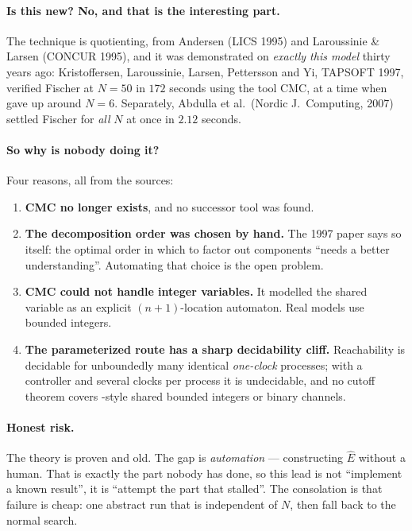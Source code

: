 \paragraph{Is this new? No, and that is the interesting part.} The technique is quotienting, from
Andersen (LICS 1995) and Laroussinie \& Larsen (CONCUR 1995), and it was demonstrated on
\emph{exactly this model} thirty years ago: Kristoffersen, Laroussinie, Larsen, Pettersson and Yi,
TAPSOFT 1997, verified Fischer at $N = 50$ in $172$ seconds using the tool CMC, at a time when
\uppaal{} gave up around $N = 6$. Separately, Abdulla et al.\ (Nordic J.\ Computing, 2007) settled
Fischer for \emph{all} $N$ at once in $2.12$ seconds.

\paragraph{So why is nobody doing it?} Four reasons, all from the sources:

\begin{enumerate}
\item \textbf{CMC no longer exists}, and no successor tool was found.
\item \textbf{The decomposition order was chosen by hand.} The 1997 paper says so itself: the
      optimal order in which to factor out components ``needs a better understanding''. Automating
      that choice is the open problem.
\item \textbf{CMC could not handle \uppaal{} integer variables.} It modelled the shared variable as
      an explicit $(n{+}1)$-location automaton. Real models use bounded integers.
\item \textbf{The parameterized route has a sharp decidability cliff.} Reachability is decidable
      for unboundedly many identical \emph{one-clock} processes; with a controller and several
      clocks per process it is undecidable, and no cutoff theorem covers \uppaal{}-style shared
      bounded integers or binary channels.
\end{enumerate}

\paragraph{Honest risk.} The theory is proven and old. The gap is \emph{automation} --- constructing
$\hat E$ without a human. That is exactly the part nobody has done, so this lead is not ``implement
a known result'', it is ``attempt the part that stalled''. The consolation is that failure is cheap:
one abstract run that is independent of $N$, then fall back to the normal search.
